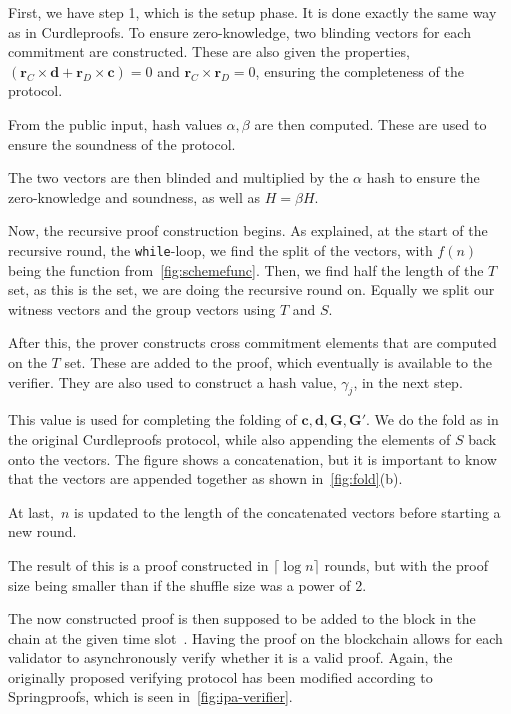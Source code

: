 First, we have step 1, which is the setup phase.
It is done exactly the same way as in Curdleproofs.
To ensure zero-knowledge, two blinding vectors for each commitment are constructed.
These are also given the properties, $(\mathbf{r}_C\times \mathbf{d}+\mathbf{r}_D\times \mathbf{c})=0$ and $\mathbf{r}_C\times\mathbf{r}_D=0$, ensuring the completeness of the protocol.

From the public input, hash values $\alpha,\beta$ are then computed.
These are used to ensure the soundness of the protocol.

The two vectors are then blinded and multiplied by the $\alpha$ hash to ensure the zero-knowledge and soundness, as well as $H=\beta H$.


Now, the recursive proof construction begins.
As explained, at the start of the recursive round, the \texttt{while}-loop, we find the split of the vectors, with $f(n)$ being the function from~\autoref{fig:schemefunc}.
Then, we find half the length of the $T$ set, as this is the set, we are doing the recursive round on.
Equally we split our witness vectors and the group vectors using $T$ and $S$.

After this, the prover constructs cross commitment elements that are computed on the $T$ set.
These are added to the proof, which eventually is available to the verifier.
They are also used to construct a hash value, $\gamma_j$, in the next step.

This value is used for completing the folding of $\mathbf{c},\mathbf{d},\mathbf{G},\mathbf{G'}$.
We do the fold as in the original Curdleproofs protocol, while also appending the elements of $S$ back onto the vectors.
The figure shows a concatenation, but it is important to know that the vectors are appended together as shown in~\autoref{fig:fold}(b).

At last,~$n$ is updated to the length of the concatenated vectors before starting a new round.

The result of this is a proof constructed in $\lceil \log n \rceil$ rounds, but with the proof size being smaller than if the shuffle size was a power of 2.

The now constructed proof is then supposed to be added to the block in the chain at the given time slot~\cite{Whisk2024}.
Having the proof on the blockchain allows for each validator to asynchronously verify whether it is a valid proof.
Again, the originally proposed verifying protocol has been modified according to Springproofs, which is seen in~\autoref{fig:ipa-verifier}.

